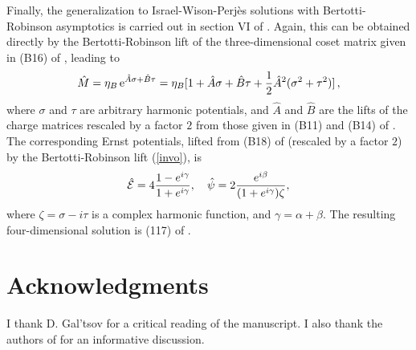 \documentclass[11pt]{article}
\def\be{\begin{equation}}
\def\ee{\end{equation}}
\def\E{{\cal E}}
\begin{document}
Finally, the generalization to Israel-Wison-Perj\`es \cite{iwp} solutions with Bertotti-Robinson asymptotics is carried out in section VI of \cite{furugori}. Again, this can be obtained directly by the Bertotti-Robinson lift of the three-dimensional coset matrix given in (B16) of \cite{bps}, leading to
\begin{equation} \label{iwp}
\hat{M} = \eta_B\,{\rm e}^{\hat{A}\sigma + \hat{B}\tau} = \eta_B[1 + \hat{A}\sigma + \hat{B}\tau + \frac{1}{2}{\hat{A}}^2(\sigma^2 + \tau^2)]\,,
\end{equation}
where $\sigma$ and $\tau$ are arbitrary harmonic potentials, and $\hat{A}$ and $\hat{B}$ are the lifts of the charge matrices rescaled by a factor $2$ from those given in (B11) and (B14) of \cite{bps}. The corresponding Ernst potentials, lifted from (B18) of \cite{bps} (rescaled by a factor $2$) by the Bertotti-Robinson lift (\ref{invo}), is
\be
\hat{\E} = 4\frac{1-{\rm}e^{i\gamma}}{1+{\rm}e^{i\gamma}}, \quad \hat{\psi} = 2\frac{e^{i\beta}}{(1+{\rm}e^{i\gamma})\zeta},
\ee
where $\zeta=\sigma-i\tau$ is a complex harmonic function, and $\gamma=\alpha+\beta$. The resulting four-dimensional solution is (117) of \cite{furugori}.

\section*{Acknowledgments}

I thank D. Gal'tsov for a critical reading of the manuscript. I also thank the authors of \cite{furugori} for an informative discussion.
\end{document}
